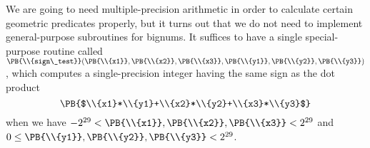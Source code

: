 We are going to need multiple-precision arithmetic in order to
calculate certain geometric predicates properly, but it turns out
that we do not need to implement general-purpose subroutines for bignums.
It suffices to have a single special-purpose routine called
$\PB{\\{sign\_test}}(\PB{\\{x1}},\PB{\\{x2}},\PB{\\{x3}},\allowbreak\PB{%
\\{y1}},\PB{\\{y2}},\PB{\\{y3}})$, which
computes a single-precision integer having the same sign as the dot product
$$\hbox{\PB{$\\{x1}*\\{y1}+\\{x2}*\\{y2}+\\{x3}*\\{y3}$}}$$
when we have $-2^{29}<\PB{\\{x1}},\PB{\\{x2}},\PB{\\{x3}}<2^{29}$ and $0\le\PB{%
\\{y1}},\PB{\\{y2}},\PB{\\{y3}}<2^{29}$.

